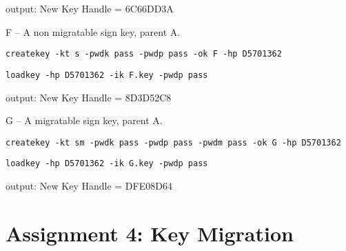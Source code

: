 \documentclass[10pt]{article}
\newcommand{\command}[1]{\texttt{#1}}
\begin{document}
    output: New Key Handle = 6C66DD3A

    F -- A non migratable sign key, parent A.

    \command{createkey -kt s -pwdk pass -pwdp pass -ok F -hp D5701362}

    \command{loadkey -hp D5701362 -ik F.key -pwdp pass}

    output: New Key Handle = 8D3D52C8

    G -- A migratable sign key, parent A.

    \command{createkey -kt sm -pwdk pass -pwdp pass -pwdm pass -ok G -hp D5701362}

    \command{loadkey -hp D5701362 -ik G.key -pwdp pass}

    output: New Key Handle = DFE08D64

\section{Assignment 4: Key Migration}
\end{document}

